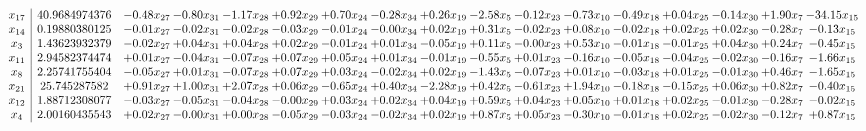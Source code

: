 \documentclass[9pt]{article}
\begin{document}
 \[\begin{array}{c| c c@{\hskip 2pt} c@{\hskip 2pt} c@{\hskip 2pt} c@{\hskip 2pt} c@{\hskip 2pt} c@{\hskip 2pt} c@{\hskip 2pt} c@{\hskip 2pt} c@{\hskip 2pt} c@{\hskip 2pt} c@{\hskip 2pt} c@{\hskip 2pt} c@{\hskip 2pt} c@{\hskip 2pt} c@{\hskip 2pt} }
 x_{17}   &  40.9684974376 & -0.48 x_{27} & -0.80 x_{31} & -1.17 x_{28} & +  0.92 x_{29} & +  0.70 x_{24} & -0.28 x_{34} & +  0.26 x_{19} & -2.58 x_{5} & -0.12 x_{23} & -0.73 x_{10} & -0.49 x_{18} & +  0.04 x_{25} & -0.14 x_{30} & +  1.90 x_{7} & -34.15 x_{15}\\
 x_{14}   &  0.19880380125 & -0.01 x_{27} & -0.02 x_{31} & -0.02 x_{28} & -0.03 x_{29} & -0.01 x_{24} & -0.00 x_{34} & +  0.02 x_{19} & +  0.31 x_{5} & -0.02 x_{23} & +  0.08 x_{10} & -0.02 x_{18} & +  0.02 x_{25} & +  0.02 x_{30} & -0.28 x_{7} & -0.13 x_{15}\\
 x_{3}   &  1.43623932379 & -0.02 x_{27} & +  0.04 x_{31} & +  0.04 x_{28} & +  0.02 x_{29} & -0.01 x_{24} & +  0.01 x_{34} & -0.05 x_{19} & +  0.11 x_{5} & -0.00 x_{23} & +  0.53 x_{10} & -0.01 x_{18} & -0.01 x_{25} & +  0.04 x_{30} & +  0.24 x_{7} & -0.45 x_{15}\\
 x_{11}   &  2.94582374474 & +  0.01 x_{27} & -0.04 x_{31} & -0.07 x_{28} & +  0.07 x_{29} & +  0.05 x_{24} & +  0.01 x_{34} & -0.01 x_{19} & -0.55 x_{5} & +  0.01 x_{23} & -0.16 x_{10} & -0.05 x_{18} & -0.04 x_{25} & -0.02 x_{30} & -0.16 x_{7} & -1.66 x_{15}\\
 x_{8}   &  2.25741755404 & -0.05 x_{27} & +  0.01 x_{31} & -0.07 x_{28} & +  0.07 x_{29} & +  0.03 x_{24} & -0.02 x_{34} & +  0.02 x_{19} & -1.43 x_{5} & -0.07 x_{23} & +  0.01 x_{10} & -0.03 x_{18} & +  0.01 x_{25} & -0.01 x_{30} & +  0.46 x_{7} & -1.65 x_{15}\\
 x_{21}   &  25.745287582 & +  0.91 x_{27} & +  1.00 x_{31} & +  2.07 x_{28} & +  0.06 x_{29} & -0.65 x_{24} & +  0.40 x_{34} & -2.28 x_{19} & +  0.42 x_{5} & -0.61 x_{23} & +  1.94 x_{10} & -0.18 x_{18} & -0.15 x_{25} & +  0.06 x_{30} & +  0.82 x_{7} & -0.40 x_{15}\\
 x_{12}   &  1.88712308077 & -0.03 x_{27} & -0.05 x_{31} & -0.04 x_{28} & -0.00 x_{29} & +  0.03 x_{24} & +  0.02 x_{34} & +  0.04 x_{19} & +  0.59 x_{5} & +  0.04 x_{23} & +  0.05 x_{10} & +  0.01 x_{18} & +  0.02 x_{25} & -0.01 x_{30} & -0.28 x_{7} & -0.02 x_{15}\\
 x_{4}   &  2.00160435543 & +  0.02 x_{27} & -0.00 x_{31} & +  0.00 x_{28} & -0.05 x_{29} & -0.03 x_{24} & -0.02 x_{34} & +  0.02 x_{19} & +  0.87 x_{5} & +  0.05 x_{23} & -0.30 x_{10} & -0.01 x_{18} & +  0.02 x_{25} & -0.02 x_{30} & -0.12 x_{7} & +  0.87 x_{15}\\

\end{array}\]
\end{document}
